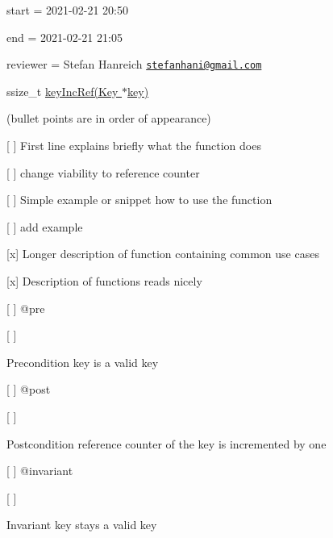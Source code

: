 
\begin{DoxyItemize}
\item start = 2021-\/02-\/21 20\+:50
\item end = 2021-\/02-\/21 21\+:05
\item reviewer = Stefan Hanreich \href{mailto:stefanhani@gmail.com}{\tt stefanhani@gmail.\+com}
\end{DoxyItemize}

{\ttfamily ssize\+\_\+t \hyperlink{group__key_ga6970a6f254d67af7e39f8e469bb162f1}{key\+Inc\+Ref(\+Key $\ast$key)}}

(bullet points are in order of appearance)


\begin{DoxyItemize}
\item \mbox{[} \mbox{]} First line explains briefly what the function does
\begin{DoxyItemize}
\item \mbox{[} \mbox{]} change viability to \textquotesingle{}reference counter\textquotesingle{}
\end{DoxyItemize}
\item \mbox{[} \mbox{]} Simple example or snippet how to use the function
\begin{DoxyItemize}
\item \mbox{[} \mbox{]} add example
\end{DoxyItemize}
\item \mbox{[}x\mbox{]} Longer description of function containing common use cases
\item \mbox{[}x\mbox{]} Description of functions reads nicely
\item \mbox{[} \mbox{]} {\ttfamily @pre}
\begin{DoxyItemize}
\item \mbox{[} \mbox{]} \begin{DoxyPrecond}{Precondition}
key is a valid key
\end{DoxyPrecond}

\end{DoxyItemize}
\item \mbox{[} \mbox{]} {\ttfamily @post}
\begin{DoxyItemize}
\item \mbox{[} \mbox{]} \begin{DoxyPostcond}{Postcondition}
reference counter of the key is incremented by one
\end{DoxyPostcond}

\end{DoxyItemize}
\item \mbox{[} \mbox{]} {\ttfamily @invariant}
\begin{DoxyItemize}
\item \mbox{[} \mbox{]} \begin{DoxyInvariant}{Invariant}
key stays a valid key
\end{DoxyInvariant}


\end{DoxyItemize}
\end{DoxyItemize}
